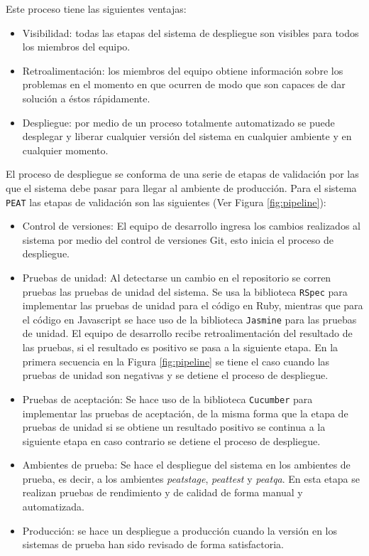Este proceso tiene las siguientes ventajas:
\begin{itemize}
\item Visibilidad: todas las etapas del sistema de despliegue son visibles
  para todos los miembros del equipo.
\item Retroalimentación: los miembros del equipo obtiene información sobre los
  problemas en el momento en que ocurren de modo que son capaces de dar solución
  a éstos rápidamente.
\item Despliegue: por medio de un proceso totalmente automatizado se puede
  desplegar y liberar cualquier versión del sistema en cualquier ambiente y en
  cualquier momento.
\end{itemize}

El proceso de despliegue se conforma de una serie de etapas de validación por las
que el sistema debe pasar para llegar al ambiente de producción. Para el sistema
\texttt{PEAT} las etapas de validación son las siguientes (Ver Figura
\ref{fig:pipeline}):
\begin{itemize}
\item Control de versiones: El equipo de desarrollo ingresa los cambios
  realizados al sistema por medio del control de versiones Git, esto inicia
  el proceso de despliegue.
\item Pruebas de unidad: Al detectarse un cambio en el repositorio se corren
  pruebas las pruebas de unidad del sistema. Se usa la biblioteca \texttt{RSpec}
  para implementar las pruebas de unidad para el código en Ruby, mientras que para
  el código en Javascript se hace uso de la biblioteca \texttt{Jasmine} para las
  pruebas de unidad. El equipo de desarrollo recibe retroalimentación del resultado
  de las pruebas, si el resultado es positivo se pasa a la siguiente etapa.
  En la primera secuencia en la Figura \ref{fig:pipeline} se tiene el caso
  cuando las pruebas de unidad son negativas y se detiene el proceso de despliegue.
\item Pruebas de aceptación: Se hace uso de la biblioteca \texttt{Cucumber}
  para implementar las pruebas de aceptación, de la misma forma que la etapa de
  pruebas de unidad si se obtiene un resultado positivo se continua a la siguiente
  etapa en caso contrario se detiene el proceso de despliegue.
\item Ambientes de prueba: Se hace el despliegue del sistema en los ambientes de
  prueba, es decir, a los ambientes \textit{peatstage}, \textit{peattest} y
  \textit{peatqa}. En esta etapa se realizan pruebas de rendimiento y de calidad
  de forma manual y automatizada.
\item Producción: se hace un despliegue a producción cuando la versión en los
  sistemas de prueba han sido revisado de forma satisfactoria.
\end{itemize}

